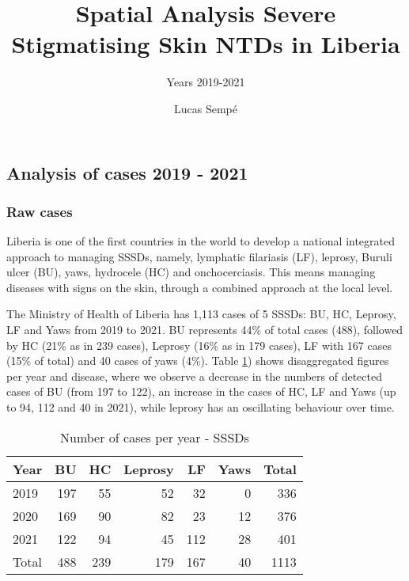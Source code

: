 \documentclass[
]{article}
\title{Spatial Analysis Severe Stigmatising Skin NTDs in Liberia}
\subtitle{Years 2019-2021}
\author{Lucas Sempé}
\date{}
\begin{document}
\maketitle

{
\setcounter{tocdepth}{2}
\tableofcontents
}
\hypertarget{analysis-of-cases-2019---2021}{%
\subsection{Analysis of cases 2019 - 2021}\label{analysis-of-cases-2019---2021}}

\hypertarget{raw-cases}{%
\subsubsection{Raw cases}\label{raw-cases}}

Liberia is one of the first countries in the world to develop a national integrated approach to managing SSSDs, namely, lymphatic filariasis (LF), leprosy, Buruli ulcer (BU), yaws, hydrocele (HC) and onchocerciasis. This means managing diseases with signs on the skin, through a combined approach at the local level.

The Ministry of Health of Liberia has 1,113 cases of 5 SSSDs: BU, HC, Leprosy, LF and Yaws from 2019 to 2021. BU represents 44\% of total cases (488), followed by HC (21\% as in 239 cases), Leprosy (16\% as in 179 cases), LF with 167 cases (15\% of total) and 40 cases of yaws (4\%). Table \ref{tab:casyear}) shows disaggregated figures per year and disease, where we observe a decrease in the numbers of detected cases of BU (from 197 to 122), an increase in the cases of HC, LF and Yaws (up to 94, 112 and 40 in 2021), while leprosy has an oscillating behaviour over time.

\begin{table}

\caption{\label{tab:casyear}Number of cases per year - SSSDs}
\centering
\begin{tabular}[t]{l|r|r|r|r|r|r}
\hline
Year & BU & HC & Leprosy & LF & Yaws & Total\\
\hline
2019 & 197 & 55 & 52 & 32 & 0 & 336\\
\hline
2020 & 169 & 90 & 82 & 23 & 12 & 376\\
\hline
2021 & 122 & 94 & 45 & 112 & 28 & 401\\
\hline
Total & 488 & 239 & 179 & 167 & 40 & 1113\\
\hline
\end{tabular}
\end{table}
\end{document}
